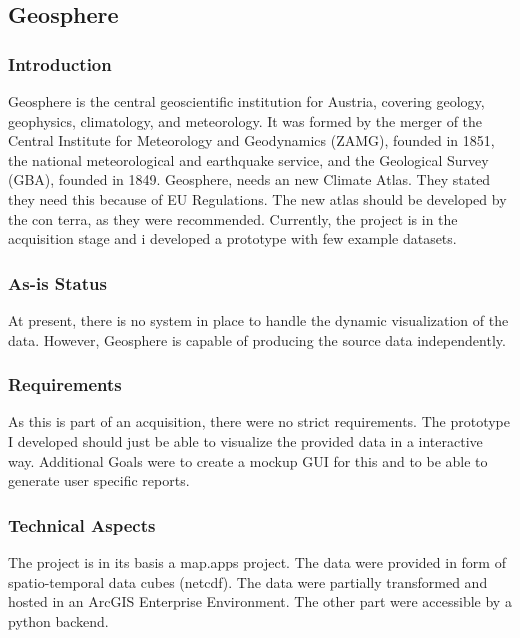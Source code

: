\documentclass[11pt, titlepage, a4paper]{article}
\begin{document}
\subsection{Geosphere}
\subsubsection{Introduction}
Geosphere is the central geoscientific institution for Austria, covering geology, geophysics, climatology, and meteorology.  It was formed by the merger of the Central Institute for Meteorology and Geodynamics (ZAMG), founded in 1851, the national meteorological and earthquake service, and the Geological Survey (GBA), founded in 1849. 
Geosphere, needs an new Climate Atlas. They stated they need this because of EU Regulations. The new atlas should be developed by the con terra, as they were recommended. Currently, the project is in the acquisition stage and i developed a prototype with few example datasets.

\subsubsection{As-is Status}
At present, there is no system in place to handle the dynamic visualization of the data. However, Geosphere is capable of producing the source data independently. 
\subsubsection{Requirements}
As this is part of an acquisition, there were no strict requirements. The prototype I developed should just be able to visualize the provided data in a interactive way. Additional Goals were to create a mockup GUI for this and to be able to generate user specific reports. 
\subsubsection{Technical Aspects}
The project is in its basis a map.apps project. The data were provided in form of spatio-temporal data cubes (netcdf). The data were partially transformed and hosted in an ArcGIS Enterprise Environment. The other part were accessible by a python backend.
\end{document}
